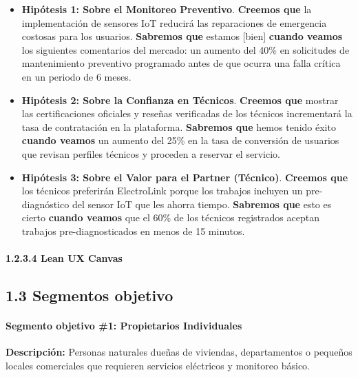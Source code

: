 \begin{itemize}
\item
  \textbf{Hipótesis 1: Sobre el Monitoreo Preventivo}. \textbf{Creemos
  que} la implementación de sensores IoT reducirá las reparaciones de
  emergencia costosas para los usuarios. \textbf{Sabremos que} estamos
  {[}bien{]} \textbf{cuando veamos} los siguientes comentarios del
  mercado: un aumento del 40\% en solicitudes de mantenimiento
  preventivo programado antes de que ocurra una falla crítica en un
  periodo de 6 meses.
\item
  \textbf{Hipótesis 2: Sobre la Confianza en Técnicos}. \textbf{Creemos
  que} mostrar las certificaciones oficiales y reseñas verificadas de
  los técnicos incrementará la tasa de contratación en la plataforma.
  \textbf{Sabremos que} hemos tenido éxito \textbf{cuando veamos} un
  aumento del 25\% en la tasa de conversión de usuarios que revisan
  perfiles técnicos y proceden a reservar el servicio.
\item
  \textbf{Hipótesis 3: Sobre el Valor para el Partner (Técnico)}.
  \textbf{Creemos que} los técnicos preferirán ElectroLink porque los
  trabajos incluyen un pre-diagnóstico del sensor IoT que les ahorra
  tiempo. \textbf{Sabremos que} esto es cierto \textbf{cuando veamos}
  que el 60\% de los técnicos registrados aceptan trabajos
  pre-diagnosticados en menos de 15 minutos.
\end{itemize}

\paragraph{1.2.3.4 Lean UX
Canvas}\label{report__10-cap1-introduccion.md__lean-ux-canvas}

\newpage

\subsection{1.3 Segmentos
objetivo}\label{report__10-cap1-introduccion.md__segmentos-objetivo}

\paragraph{Segmento objetivo \#1: Propietarios
Individuales}\label{report__10-cap1-introduccion.md__segmento-objetivo-1-propietarios-individuales}

\hfill\break

\textbf{Descripción:} Personas naturales dueñas de viviendas,
departamentos o pequeños locales comerciales que requieren servicios
eléctricos y monitoreo básico.

